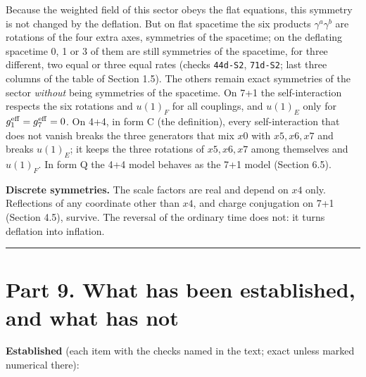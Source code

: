 \documentclass[
  10pt,
]{article}
\begin{document}
Because the weighted field of this sector obeys the flat equations, this
symmetry is not changed by the deflation. But on flat spacetime the six
products \(\gamma^a\gamma^b\) are rotations of the four extra axes,
symmetries of the spacetime; on the deflating spacetime 0, 1 or 3 of
them are still symmetries of the spacetime, for three different, two
equal or three equal rates (checks \texttt{44d-S2}, \texttt{71d-S2};
last three columns of the table of Section 1.5). The others remain exact
symmetries of the sector \emph{without} being symmetries of the
spacetime. On 7+1 the self-interaction respects the six rotations and
\(u(1)_F\) for all couplings, and \(u(1)_E\) only for
\(g_1^{\rm eff}=g_7^{\rm eff}=0\). On 4+4, in form C (the definition),
every self-interaction that does not vanish breaks the three generators
that mix \(x0\) with \(x5,x6,x7\) and breaks \(u(1)_E\); it keeps the
three rotations of \(x5,x6,x7\) among themselves and \(u(1)_F\). In form
Q the 4+4 model behaves as the 7+1 model (Section 6.5).

\textbf{Discrete symmetries.} The scale factors are real and depend on
\(x4\) only. Reflections of any coordinate other than \(x4\), and charge
conjugation on 7+1 (Section 4.5), survive. The reversal of the ordinary
time does not: it turns deflation into inflation.

\begin{center}\rule{0.5\linewidth}{0.5pt}\end{center}

\hypertarget{part-9.-what-has-been-established-and-what-has-not}{%
\section{Part 9. What has been established, and what has
not}\label{part-9.-what-has-been-established-and-what-has-not}}

\textbf{Established} (each item with the checks named in the text; exact
unless marked numerical there):
\end{document}

